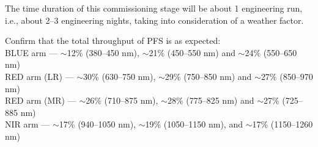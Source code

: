 \begin{itemize}
\begin{enumerate}
\end{enumerate}

The time duration of this commissioning stage will be about 1 engineering run, i.e., about 2--3 engineering nights, taking into consideration of a weather factor.

\begin{itembox}[l]{}
Confirm that the total throughput of PFS is as expected:\\
BLUE arm --- $\sim$12\% (380--450 nm), $\sim$21\% (450--550 nm) and $\sim$24\% (550--650 nm) \\
RED arm (LR) --- $\sim$30\% (630--750 nm), $\sim$29\% (750--850 nm) and $\sim$27\% (850--970 nm) \\
RED arm (MR) --- $\sim$26\% (710--875 nm), $\sim$28\% (775--825 nm) and $\sim$27\% (725--885 nm) \\
NIR arm --- $\sim$17\% (940--1050 nm), $\sim$19\% (1050--1150 nm), and $\sim$17\% (1150--1260 nm)
\end{itembox}

\end{itemize}
